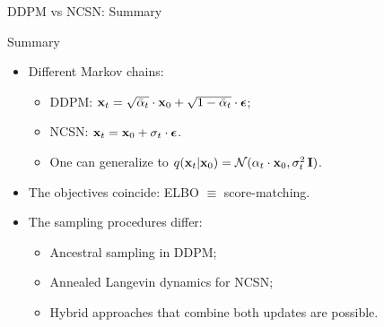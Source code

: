 \documentclass{beamer}
\begin{document}
\begin{frame}{DDPM vs NCSN: Summary}
	\begin{block}{Summary}
		\begin{itemize}
		\item Different Markov chains:
			\begin{itemize}
				\item DDPM: $\mathbf{x}_t = \sqrt{\bar{\alpha}_t} \cdot \mathbf{x}_0 + \sqrt{1 - \bar{\alpha}_t} \cdot \boldsymbol{\epsilon}$;
				\item NCSN: $\mathbf{x}_t = \mathbf{x}_0 + \sigma_t \cdot \boldsymbol{\epsilon}$.
				\item One can generalize to $q(\mathbf{x}_t |\mathbf{x}_0) = \mathcal{N}(\alpha_t \cdot \mathbf{x}_0, \sigma^2_t\, \mathbf{I})$.
			\end{itemize}
		\eqpause
		\item The objectives coincide: ELBO $\equiv$ score-matching.
		\eqpause
		\item The sampling procedures differ:
			\begin{itemize}
				\item Ancestral sampling in DDPM;
				\item Annealed Langevin dynamics for NCSN;
				\item Hybrid approaches that combine both updates are possible.
			\end{itemize}
		\end{itemize}
	\end{block}
\end{frame}
\end{document}
